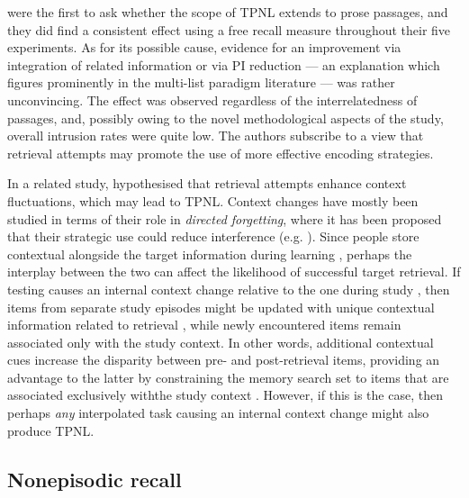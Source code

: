 \documentclass[../main.tex]{subfiles}
\begin{document}
\cite{wissmanInterimTestEffect2011} were the first to ask whether the scope 
of TPNL extends to prose passages, and they did find a consistent effect 
using a free recall measure throughout their five experiments. As for its 
possible cause, evidence for an improvement via integration of related 
information or via PI reduction --- an explanation which figures prominently 
in the multi-list paradigm literature \citep{darleyEffectsPriorFree1971, 
szpunarTestingStudyInsulates2008} --- was rather unconvincing. The effect 
was observed regardless of the interrelatedness of passages, and, possibly 
owing to the novel methodological aspects of the study, overall intrusion 
rates were quite low. The authors subscribe to a view that retrieval 
attempts may promote the use of more effective encoding strategies. 

In a related study, \cite{divisRetrievalSpeedsContext2014} hypothesised that 
retrieval attempts enhance context fluctuations, which may lead to TPNL. 
Context changes have mostly been studied in terms of their role in 
\textit{directed forgetting}, where it has been proposed that their 
strategic use could reduce interference (e.g. 
\citealp{sahakyanContextualChangeAccount2002}). Since people store 
contextual alongside the target information during learning 
\citep{howardDistributedRepresentationTemporal2002,
	tulvingEncodingSpecificityRetrieval1973, 
	mensinkModelInterferenceForgetting1988}, perhaps the 
interplay between the two can affect the likelihood of successful target 
retrieval. If testing causes an internal context change relative to the one 
during study \citep{jangContextRetrievalContext2008, 
sahakyanContextualChangeAccount2002}, then items from separate study 
episodes might be updated with unique contextual information related to 
retrieval \citep{karpickeRetrievalBasedLearning2014, 
lehmanEpisodicContextAccount2014}, while newly encountered items remain 
associated only with the study context. In other words, additional 
contextual cues increase the disparity between pre- and post-retrieval 
items, providing an advantage to the latter by constraining the memory 
search set to items that are associated exclusively withthe study context 
\citep{szpunarTestingStudyInsulates2008}. However, if this is the case, then 
perhaps \textit{any} interpolated task causing an internal context change 
might also produce TPNL.

\hypertarget{nonepisodic}{%
	\subsection{Nonepisodic recall}}
\end{document}
